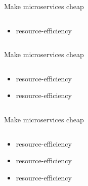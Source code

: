 \documentclass{beamer}
\begin{document}
\begin{frame}{Make microservices cheap}
    \begin{columns}
        \begin{column}{0.36\textwidth}
            \begin{itemize}
                \item resource-efficiency
            \end{itemize}
        \end{column}
        \begin{column}{0.36\textwidth}
        \end{column}
        \begin{column}{0.36\textwidth}
        \end{column}
    \end{columns}
\end{frame}
\begin{frame}{Make microservices cheap}
    \begin{columns}
        \begin{column}{0.36\textwidth}
            \begin{itemize}
                \item resource-efficiency
                \item resource-efficiency
            \end{itemize}
        \end{column}
        \begin{column}{0.36\textwidth}
        \end{column}
        \begin{column}{0.36\textwidth}
        \end{column}
    \end{columns}
\end{frame}
\begin{frame}{Make microservices cheap}
    \begin{columns}
        \begin{column}{0.36\textwidth}
            \begin{itemize}
                \item resource-efficiency
                \item resource-efficiency
                \item resource-efficiency
            \end{itemize}
        \end{column}
        \begin{column}{0.36\textwidth}
        \end{column}
        \begin{column}{0.36\textwidth}
        \end{column}
    \end{columns}
\end{frame}
\end{document}
